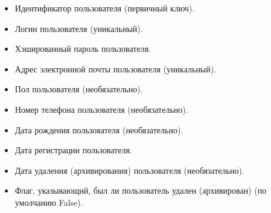 \documentclass[letterpaper,10pt,russian]{sphinxmanual}
\begin{document}
\sphinxAtStartPar
{}
\begin{itemize}
\item {} 
\sphinxAtStartPar
{}  Идентификатор пользователя (первичный ключ).

\item {} 
\sphinxAtStartPar
{}  Логин пользователя (уникальный).

\item {} 
\sphinxAtStartPar
{}  Хэшированный пароль пользователя.

\item {} 
\sphinxAtStartPar
{}  Адрес электронной почты пользователя (уникальный).

\item {} 
\sphinxAtStartPar
{}  Пол пользователя (необязательно).

\item {} 
\sphinxAtStartPar
{}  Номер телефона пользователя (необязательно).

\item {} 
\sphinxAtStartPar
{}  Дата рождения пользователя (необязательно).

\item {} 
\sphinxAtStartPar
{}  Дата регистрации пользователя.

\item {} 
\sphinxAtStartPar
{}  Дата удаления (архивирования) пользователя (необязательно).

\item {} 
\sphinxAtStartPar
{}  Флаг, указывающий, был ли пользователь удален (архивирован) (по умолчанию False).

\end{itemize}
\end{document}

